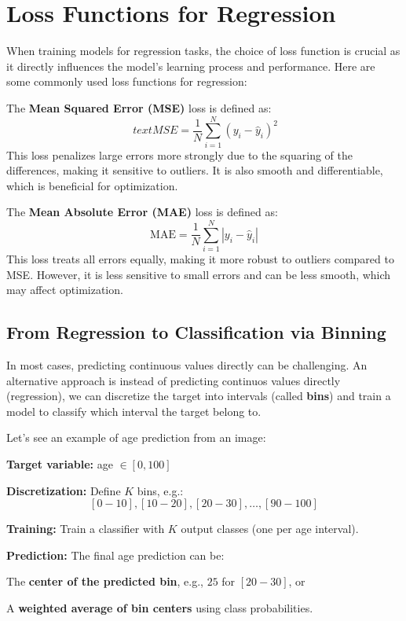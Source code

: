 \section{Loss Functions for Regression}
When training models for regression tasks, the choice of loss function is crucial as it directly influences the model's learning process and performance. Here are some commonly used loss functions for regression:
\begin{compactitemize}
    \item The \textbf{Mean Squared Error (MSE)} loss is defined as:
    \[
    \   text{MSE} = \frac{1}{N} \sum_{i=1}^{N} (y_i - \hat{y}_i)^2
    \]
    This loss penalizes large errors more strongly due to the squaring of the differences, making it sensitive to outliers. It is also smooth and differentiable, which is beneficial for optimization.
    \item The \textbf{Mean Absolute Error (MAE)} loss is defined as:
    \[
    \text{MAE} = \frac{1}{N} \sum_{i=1}^{N} |y_i - \hat{y}_i|
    \]
    This loss treats all errors equally, making it more robust to outliers compared to MSE. However, it is less sensitive to small errors and can be less smooth, which may affect optimization.
\end{compactitemize}

\subsection{From Regression to Classification via Binning}
In most cases, predicting continuous values directly can be challenging. An alternative approach is instead of predicting continuos values directly (regression), we can discretize the target into intervals (called \textbf{bins}) and train a model to classify which interval the target belong to.

Let's see an example of age prediction from an image:
\begin{compactitemize}
    \item \textbf{Target variable:} age $\in [0, 100]$
    \item \textbf{Discretization:} Define $K$ bins, e.g.:
    \[
    [0-10], [10-20], [20-30], \dots, [90-100]
    \]
    \item \textbf{Training:} Train a classifier with $K$ output classes (one per age interval).
    \item \textbf{Prediction:} The final age prediction can be:
    \begin{compactitemize}
        \item The \textbf{center of the predicted bin}, e.g., $25$ for $[20-30]$, or
        \item A \textbf{weighted average of bin centers} using class probabilities.
    \end{compactitemize}
\end{compactitemize}

